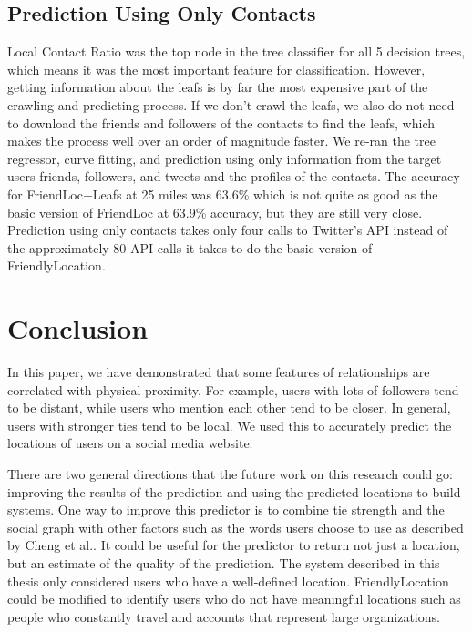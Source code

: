 \documentclass{sig-alternate}
\begin{document}
\subsection{Prediction Using Only Contacts}
Local Contact Ratio was the top node in the tree classifier for all 5 decision
trees, which means it was the most important feature for classification.
%
However, getting information about the leafs is by far the most expensive part
of the crawling and predicting process.
%
If we don't crawl the leafs, we also do not need to download the friends and
followers of the contacts to find the leafs, which makes the process well over
an order of magnitude faster.
%
We re-ran the tree regressor, curve fitting, and prediction using only
information from the target users friends, followers, and tweets and the
profiles of the contacts.
%
The accuracy for FriendLoc$-$Leafs at 25 miles was 63.6\% which is not quite as
good as the basic version of FriendLoc at 63.9\% accuracy, but they are still
very close.
%
Prediction using only contacts takes only four calls to Twitter's API instead
of the approximately 80 API calls it takes to do the basic version of
FriendlyLocation.

\section{Conclusion}

In this paper, we have demonstrated that some features of relationships are
correlated with physical proximity.
%
For example, users with lots of followers tend to be distant, while users who
mention each other tend to be closer.
%
In general, users with stronger ties tend to be local.
%
We used this to accurately predict the locations of users on a social media
website.

There are two general directions that the future work on this research could
go: improving the results of the prediction and using the predicted locations
to build systems.
%
One way to improve this predictor is to combine tie strength and the social
graph with other factors such as the words users choose to use as described by
Cheng et al.\cite{cheng2010you}.
%
It could be useful for the predictor to return not just a location, but an
estimate of the quality of the prediction.
%
The system described in this thesis only considered users who have a
well-defined location.
%
FriendlyLocation could be modified to identify users who do not have meaningful
locations such as people who constantly travel and accounts that represent
large organizations.
\end{document}
